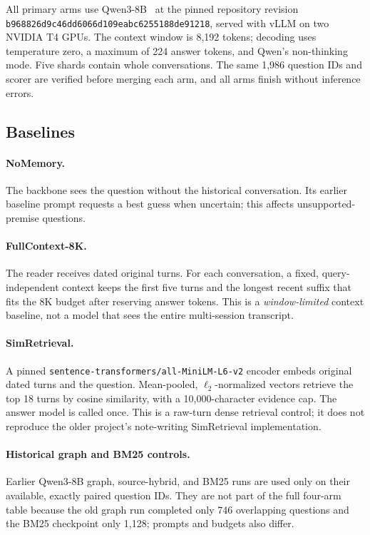 \documentclass[11pt]{article}
\begin{document}
All primary arms use Qwen3-8B~\cite{yang2025qwen3} at the pinned repository
revision \texttt{b968826d9c46dd60\allowbreak 66d109eabc625518\allowbreak 8de91218}, served with
vLLM on two NVIDIA T4 GPUs. The context window is 8,192 tokens; decoding
uses temperature zero, a maximum of 224 answer tokens, and Qwen's
non-thinking mode. Five shards contain whole conversations. The same 1,986
question IDs and scorer are verified before merging each arm, and all arms
finish without inference errors.

\subsection{Baselines}

\paragraph{NoMemory.} The backbone sees the question without the historical
conversation. Its earlier baseline prompt requests a best guess when
uncertain; this affects unsupported-premise questions.

\paragraph{FullContext-8K.} The reader receives dated original turns. For
each conversation, a fixed, query-independent context keeps the first five
turns and the longest recent suffix that fits the 8K budget after reserving
answer tokens. This is a \emph{window-limited} context baseline, not a model
that sees the entire multi-session transcript.

\paragraph{SimRetrieval.} A pinned
\texttt{sentence-transformers/all-MiniLM-L6-v2} encoder embeds original
dated turns and the question. Mean-pooled, $\ell_2$-normalized vectors
retrieve the top 18 turns by cosine similarity, with a 10,000-character
evidence cap. The answer model is called once. This is a raw-turn dense
retrieval control; it does not reproduce the older project's note-writing
SimRetrieval implementation.

\paragraph{Historical graph and BM25 controls.} Earlier Qwen3-8B graph,
source-hybrid, and BM25 runs are used only on their available, exactly
paired question IDs. They are not part of the full four-arm table because
the old graph run completed only 746 overlapping questions and the BM25
checkpoint only 1,128; prompts and budgets also differ.
\end{document}
